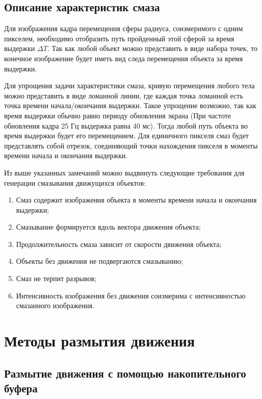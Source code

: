 \subsection{Описание характеристик смаза}
\label{cha:analysis_charestic}
Для изображения кадра перемещения сферы радиуса, соизмеримого с одним пикселем, необходимо отобразить путь пройденный этой сферой за время выдержки $\Delta T$. Так как любой объект можно представить в виде набора точек, то конечное изображение будет иметь вид следа перемещения объекта за время выдержки.
\par
Для упрощения задачи характеристики смаза, кривую перемещения любого тела можно представить в виде ломанной линии, где каждая точка ломанной есть точка времени начала/окончания выдержки. Такое упрощение возможно, так как время выдержки обычно равно периоду обновления экрана (При частоте обновления кадра 25 Гц выдержка равна 40 мс). Тогда любой путь объекта во время выдержки будет его перемещением. Для единичного пикселя смаз будет представлять собой отрезок, соединяющий точки нахождения пикселя в моменты времени начала и окончания выдержки.
\par
Из выше указанных замечаний можно выдвинуть следующие требования для генерации смазывания движущихся объектов:
\begin{enumerate}
    \item Смаз содержит изображения объекта в моменты времени начала и окончания выдержки;
    \item Смазывание формируется вдоль вектора движения объекта;
    \item Продолжительность смаза зависит от скорости движения объекта;
    \item Объекты без движения не подвергаются смазыванию;
    \item Смаз не терпит разрывов;
    \item Интенсивность изображения без движения соизмерима с интенсивностью смазанного изображения.
\end{enumerate}

\section{Методы размытия движения}

\subsection{Размытие движения с помощью накопительного буфера}
\label{cha:analysis_acum}

